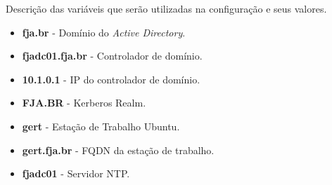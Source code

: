 Descrição das variáveis que serão utilizadas na configuração e seus valores.

\begin{itemize}
	\item \textbf{fja.br} -  Domínio do \textit{Active Directory}.
	\item \textbf{fjadc01.fja.br} - Controlador de domínio.
	\item \textbf{10.1.0.1} - IP do controlador de domínio.
	\item \textbf{FJA.BR} - Kerberos Realm.
	\item \textbf{gert} - Estação de Trabalho Ubuntu.
	\item \textbf{gert.fja.br} - FQDN da estação de trabalho.
	\item \textbf{fjadc01} - Servidor NTP.
\end{itemize}

